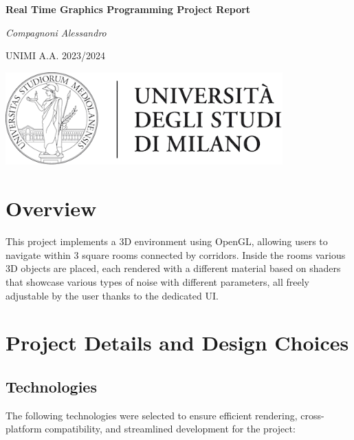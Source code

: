 \documentclass[12pt]{article}
\begin{document}
\begin{titlepage}
    \centering
    \vspace*{2cm}
    {\Huge\bfseries Real Time Graphics Programming Project Report\par}
    \vspace{1.5cm}
    {\Large\itshape Compagnoni Alessandro\par}
    \vspace{0.5cm}
   {\large UNIMI A.A. 2023/2024\par}
    \vfill
    \includegraphics[width=0.8\textwidth]{Images/logoUnimi.png} %
    \vfill
\end{titlepage}

\tableofcontents
\newpage

\section{Overview}
\label{sec:overview}

This project implements a 3D environment using OpenGL, allowing users to navigate within 3 square rooms connected by corridors. Inside the rooms various 3D objects are placed, each rendered with a different material based on shaders that showcase various types of noise with different parameters, all freely adjustable by the user thanks to the dedicated UI.

\section{Project Details and Design Choices}
\label{sec:project_details}
\subsection{Technologies}
The following technologies were selected to ensure efficient rendering, cross-platform compatibility, and streamlined development for the project:
\end{document}
